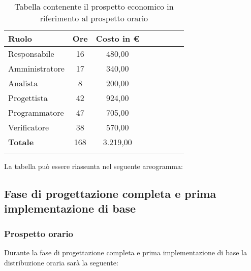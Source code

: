 			\begin{longtable}{|l|c|c|c|c|c|c|c|}
				\hline
				\rowcolor{lighter-grayer}
				\textbf{Ruolo} & \textbf{Ore} & \textbf{Costo in €} \\
				\hline
				\endfirsthead
				
				\hline
				Responsabile & 16 & 480,00\\
				\hline
				\hline
				Amministratore & 17 & 340,00\\
				\hline
				\hline
				Analista & 8 & 200,00\\
				\hline
				\hline
				Progettista & 42 & 924,00\\
				\hline
				\hline
				Programmatore & 47 & 705,00\\
				\hline
				\hline
				Verificatore & 38 & 570,00\\
				\hline
				\textbf{Totale} & 168 & 3.219,00\\
				\hline
				\caption{Tabella contenente il prospetto economico in riferimento al prospetto orario}
			\end{longtable}
			\pagebreak
		
			La tabella può essere riassunta nel seguente areogramma:

			\subsection{Fase di progettazione completa e prima implementazione di base}
            \subsubsection{Prospetto orario}
			Durante la fase di progettazione completa e prima implementazione di base la distribuzione oraria sarà la seguente:
			
